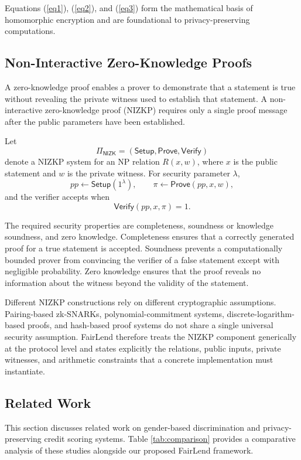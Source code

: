\documentclass[a4paper,fleqn]{cas-dc}
\begin{document}
Equations (\ref{eq1}), (\ref{eq2}), and (\ref{eq3}) form the mathematical basis of homomorphic encryption and are foundational to privacy-preserving computations.

\subsection{Non-Interactive Zero-Knowledge Proofs} 

A zero-knowledge proof enables a prover to demonstrate that a statement is true without revealing the private witness used to establish that statement. A non-interactive zero-knowledge proof (NIZKP) requires only a single proof message after the public parameters have been established. 

Let \[ \Pi_{\mathsf{NIZK}} = (\mathsf{Setup},\mathsf{Prove},\mathsf{Verify}) \] denote a NIZKP system for an NP relation $R(x,w)$, where $x$ is the public statement and $w$ is the private witness. For security parameter $\lambda$, \[ pp\leftarrow\mathsf{Setup}(1^\lambda), \qquad \pi\leftarrow\mathsf{Prove}(pp,x,w), \] and the verifier accepts when \[ \mathsf{Verify}(pp,x,\pi)=1. \] 

The required security properties are completeness, soundness or knowledge soundness, and zero knowledge. Completeness ensures that a correctly generated proof for a true statement is accepted. Soundness prevents a computationally bounded prover from convincing the verifier of a false statement except with negligible probability. Zero knowledge ensures that the proof reveals no information about the witness beyond the validity of the statement. 

Different NIZKP constructions rely on different cryptographic assumptions. Pairing-based zk-SNARKs, polynomial-commitment systems, discrete-logarithm-based proofs, and hash-based proof systems do not share a single universal security assumption. FairLend therefore treats the NIZKP component generically at the protocol level and states explicitly the relations, public inputs, private witnesses, and arithmetic constraints that a concrete implementation must instantiate.

\subsection{Related Work}

This section discusses related work on gender-based discrimination and privacy-preserving credit scoring systems. Table \ref{tab:comparison} provides a comparative analysis of these studies alongside our proposed FairLend framework.
\end{document}

